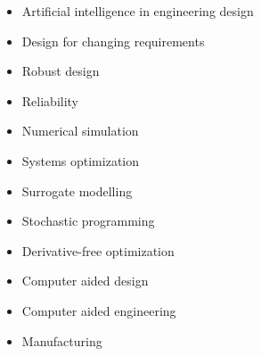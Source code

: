 \documentclass[12pt]{article} %
\begin{document}
\setlength{} %

\begin{paracol}{2} %

	\begin{itemize}\itemsep0em 
		\item Artificial intelligence in engineering design
		\item Design for changing requirements
		\item Robust design
		\item Reliability
		\item Numerical simulation
		\item Systems optimization
	\end{itemize}
		
	
	\switchcolumn %
	

	\begin{itemize}\itemsep0em 
		\item Surrogate modelling
		\item Stochastic programming
		\item Derivative-free optimization
		\item Computer aided design
		\item Computer aided engineering
		\item Manufacturing
	\end{itemize}

	
\end{paracol}

\end{document}
